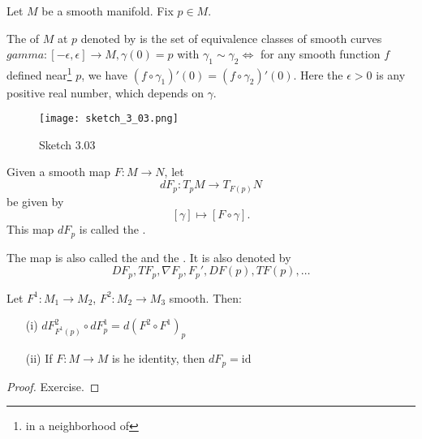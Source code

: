 Let \(M\) be a smooth manifold. Fix \(p\in M\). 
\begin{definition*}
    The  of \(M\) at \(p\) denoted by  is 
    the set of equivalence classes of smooth curves \(gamma:[-\epsilon,\epsilon]\to M,\gamma(0)=p\)
    with \(\gamma_1\sim\gamma_2\iff\) for any smooth function \(f\) defined near\footnote{in a neighborhood of} \(p\), we have 
    \((f\circ\gamma_1)'(0)=(f\circ \gamma_2)'(0)\). Here the \(\epsilon>0\) is any positive real number, which depends on \(\gamma\).
\end{definition*} 
\begin{figure}[H]
    \centering
    \texttt{[image: sketch\_3\_03.png]}
    \caption{Sketch 3.03}
\end{figure}

\begin{definition*}
    Given a smooth map \(F:M\to N\), let
    \[dF_p:T_pM\to T_{F(p)}N\]
    be given by 
    \[[\gamma]\mapsto [F\circ\gamma].\]
    This map \(dF_p\) is called the .
\end{definition*}

\begin{remark}
    The map is also called the  and the .
    It is also denoted by \[DF_p,TF_p,\nabla F_p,F_p',DF(p),TF(p),\dots\]
\end{remark}

\begin{lemma}\label{lem:3.1}
    Let \(F^1:M_1\to M_2\), \(F^2:M_2\to M_3\) smooth. Then:
    \begin{enumerate}
        \item[(i)]\(dF^2_{F^1(p)}\circ dF_p^1=d(F^2\circ F^1)_p\)
        \item[(ii)] If \(F:M\to M\) is he identity, then \(dF_p=\text{id}\)  
    \end{enumerate}
\end{lemma}

\begin{proof}
    Exercise.
\end{proof}